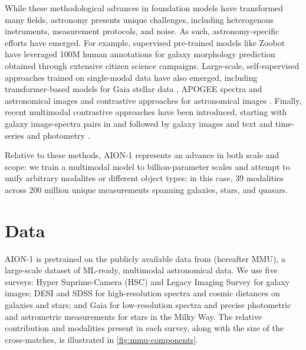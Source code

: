 \documentclass[]{polymathic}
\begin{document}
While these methodological advances in foundation models have transformed many fields, astronomy presents unique challenges, including heterogenous instruments, measurement protocols, and noise. As such, astronomy-specific efforts have emerged. For example, supervised pre-trained models like Zoobot \citep{Walmsley2024} have leveraged 100M human annotations for galaxy morphology prediction obtained through extensive citizen science campaigns. Large-scale, self-supervised approaches trained on single-modal data have also emerged, including transformer-based models for Gaia stellar data \citep{Leung2024}, APOGEE spectra \citep{Koblischke2024} and astronomical images \citep{Smith2024} and contrastive approaches for astronomical images \citep{Hayat2021, stein2021self, stein2022mining}. Finally, recent multimodal contrastive approaches have been introduced, starting with galaxy image-spectra pairs in \citet{Parker2024} and followed by galaxy images and text \citep{Mishra-Sharma2024} and time-series and photometry \citep{Zhang2024, rizhko2024astrom3}.

Relative to these methods, AION-1 represents an advance in both scale and scope: we train a multimodal model to billion-parameter scales and attempt to unify arbitrary modalites or different object types; in this case, 39 modalities across 200 million unique measurements spanning galaxies, stars, and quasars. 

\section{Data}

AION-1 is pretrained on the publicly available data from \cite{MMU} (hereafter MMU), a large-scale dataset of ML-ready, multimodal astronomical data. We use five surveys: Hyper Suprime-Camera (HSC) \citep{aihara2018hyper} and Legacy Imaging Survey \citep{dey2019overview} for galaxy images; DESI \citep{aghamousa2016desi} and SDSS \citep{york2000sloan} for high-resolution spectra and cosmic distances on galaxies and stars; and Gaia \citep{gaia2016gaia} for low-resolution spectra and precise photometric and astrometric measurements for stars in the Milky Way. The relative contribution and modalities present in each survey, along with the size of the cross-matches, is illustrated in \autoref{fig:mmu-components}. 
\end{document}
